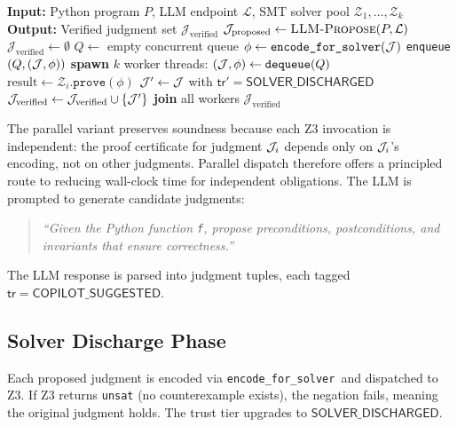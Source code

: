 \documentclass[11pt]{article}
\newcommand{\CopilotSugg}{\ensuremath{\mathsf{COPILOT\_SUGGESTED}}}
\newcommand{\SolverDisch}{\ensuremath{\mathsf{SOLVER\_DISCHARGED}}}
\newcommand{\tr}{\mathsf{tr}}                        %
\newcommand{\EncodeForSolver}{\texttt{encode\_for\_solver}}
\begin{document}
\begin{algorithm}[H]
\caption{Parallel LLM-Z3 Orchestration}
\label{alg:parallel}
\begin{algorithmic}[1]
\STATE \textbf{Input:} Python program $P$, LLM endpoint $\mathcal{L}$,
       SMT solver pool $\mathcal{Z}_1, \ldots, \mathcal{Z}_k$
\STATE \textbf{Output:} Verified judgment set $\mathcal{J}_{\text{verified}}$
\STATE $\mathcal{J}_{\text{proposed}} \gets \textsc{LLM-Propose}(P, \mathcal{L})$
\STATE $\mathcal{J}_{\text{verified}} \gets \emptyset$
\STATE $Q \gets$ empty concurrent queue
  \STATE $\phi \gets \texttt{encode\_for\_solver}(\mathcal{J})$
  \STATE \texttt{enqueue}$(Q, (\mathcal{J}, \phi))$
\ENDFOR
\STATE \textbf{spawn} $k$ worker threads:
    \STATE $(\mathcal{J}, \phi) \gets \texttt{dequeue}(Q)$
    \STATE $\text{result} \gets \mathcal{Z}_i.\texttt{prove}(\phi)$
      \STATE $\mathcal{J}' \gets \mathcal{J}$ with $\tr' = \SolverDisch$
      \STATE $\mathcal{J}_{\text{verified}} \gets \mathcal{J}_{\text{verified}} \cup \{\mathcal{J}'\}$
        \hfill{}
    \ENDIF
  \ENDWHILE
\ENDFOR
\STATE \textbf{join} all workers
\RETURN $\mathcal{J}_{\text{verified}}$
\end{algorithmic}
\end{algorithm}

The parallel variant preserves soundness because each Z3 invocation is
independent: the proof certificate for judgment $\mathcal{J}_i$ depends only on
$\mathcal{J}_i$'s encoding, not on other judgments.  Parallel dispatch therefore
offers a principled route to reducing wall-clock time for independent
obligations.
The LLM is prompted to generate candidate judgments:
\begin{quote}
\textit{``Given the Python function \texttt{f}, propose preconditions, 
postconditions, and invariants that ensure correctness.''}
\end{quote}
The LLM response is parsed into judgment tuples, each tagged $\tr = 
\CopilotSugg$.

\subsection{Solver Discharge Phase}
Each proposed judgment is encoded via \EncodeForSolver\ and dispatched to Z3. 
If Z3 returns \texttt{unsat} (no counterexample exists), the negation fails, 
meaning the original judgment holds. The trust tier upgrades to \SolverDisch.
\end{document}
